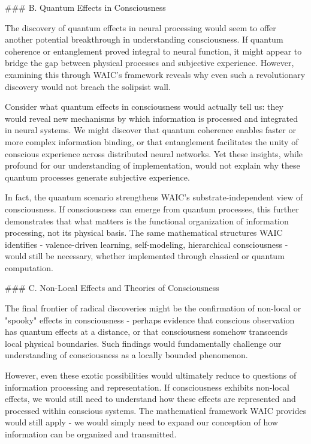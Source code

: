 ### B. Quantum Effects in Consciousness

The discovery of quantum effects in neural processing would seem to offer another potential breakthrough in understanding consciousness. If quantum coherence or entanglement proved integral to neural function, it might appear to bridge the gap between physical processes and subjective experience. However, examining this through WAIC's framework reveals why even such a revolutionary discovery would not breach the solipsist wall.

Consider what quantum effects in consciousness would actually tell us: they would reveal new mechanisms by which information is processed and integrated in neural systems. We might discover that quantum coherence enables faster or more complex information binding, or that entanglement facilitates the unity of conscious experience across distributed neural networks. Yet these insights, while profound for our understanding of implementation, would not explain why these quantum processes generate subjective experience.

In fact, the quantum scenario strengthens WAIC's substrate-independent view of consciousness. If consciousness can emerge from quantum processes, this further demonstrates that what matters is the functional organization of information processing, not its physical basis. The same mathematical structures WAIC identifies - valence-driven learning, self-modeling, hierarchical consciousness - would still be necessary, whether implemented through classical or quantum computation.

### C. Non-Local Effects and Theories of Consciousness

The final frontier of radical discoveries might be the confirmation of non-local or "spooky" effects in consciousness - perhaps evidence that conscious observation has quantum effects at a distance, or that consciousness somehow transcends local physical boundaries. Such findings would fundamentally challenge our understanding of consciousness as a locally bounded phenomenon.

However, even these exotic possibilities would ultimately reduce to questions of information processing and representation. If consciousness exhibits non-local effects, we would still need to understand how these effects are represented and processed within conscious systems. The mathematical framework WAIC provides would still apply - we would simply need to expand our conception of how information can be organized and transmitted.

